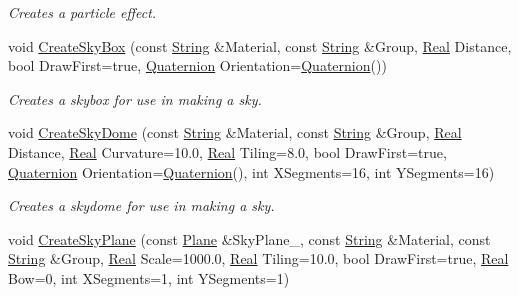 \begin{DoxyCompactItemize}
\begin{DoxyCompactList}\small\item\em Creates a particle effect. \item\end{DoxyCompactList}\item 
void \hyperlink{classMezzanine_1_1SceneManager_aaa3c4b8d15aa74c767a21d725de25ec7}{CreateSkyBox} (const \hyperlink{namespaceMezzanine_acf9fcc130e6ebf08e3d8491aebcf1c86}{String} \&Material, const \hyperlink{namespaceMezzanine_acf9fcc130e6ebf08e3d8491aebcf1c86}{String} \&Group, \hyperlink{namespaceMezzanine_a726731b1a7df72bf3583e4a97282c6f6}{Real} Distance, bool DrawFirst=true, \hyperlink{classMezzanine_1_1Quaternion}{Quaternion} Orientation=\hyperlink{classMezzanine_1_1Quaternion}{Quaternion}())
\begin{DoxyCompactList}\small\item\em Creates a skybox for use in making a sky. \item\end{DoxyCompactList}\item 
void \hyperlink{classMezzanine_1_1SceneManager_a5862eefa87c9fcda9fdba7fa69efd6cf}{CreateSkyDome} (const \hyperlink{namespaceMezzanine_acf9fcc130e6ebf08e3d8491aebcf1c86}{String} \&Material, const \hyperlink{namespaceMezzanine_acf9fcc130e6ebf08e3d8491aebcf1c86}{String} \&Group, \hyperlink{namespaceMezzanine_a726731b1a7df72bf3583e4a97282c6f6}{Real} Distance, \hyperlink{namespaceMezzanine_a726731b1a7df72bf3583e4a97282c6f6}{Real} Curvature=10.0, \hyperlink{namespaceMezzanine_a726731b1a7df72bf3583e4a97282c6f6}{Real} Tiling=8.0, bool DrawFirst=true, \hyperlink{classMezzanine_1_1Quaternion}{Quaternion} Orientation=\hyperlink{classMezzanine_1_1Quaternion}{Quaternion}(), int XSegments=16, int YSegments=16)
\begin{DoxyCompactList}\small\item\em Creates a skydome for use in making a sky. \item\end{DoxyCompactList}\item 
void \hyperlink{classMezzanine_1_1SceneManager_a6cea438ed9b13cf613b07e2dd6467c4e}{CreateSkyPlane} (const \hyperlink{classMezzanine_1_1Plane}{Plane} \&SkyPlane\_\-, const \hyperlink{namespaceMezzanine_acf9fcc130e6ebf08e3d8491aebcf1c86}{String} \&Material, const \hyperlink{namespaceMezzanine_acf9fcc130e6ebf08e3d8491aebcf1c86}{String} \&Group, \hyperlink{namespaceMezzanine_a726731b1a7df72bf3583e4a97282c6f6}{Real} Scale=1000.0, \hyperlink{namespaceMezzanine_a726731b1a7df72bf3583e4a97282c6f6}{Real} Tiling=10.0, bool DrawFirst=true, \hyperlink{namespaceMezzanine_a726731b1a7df72bf3583e4a97282c6f6}{Real} Bow=0, int XSegments=1, int YSegments=1)

\end{DoxyCompactItemize}
